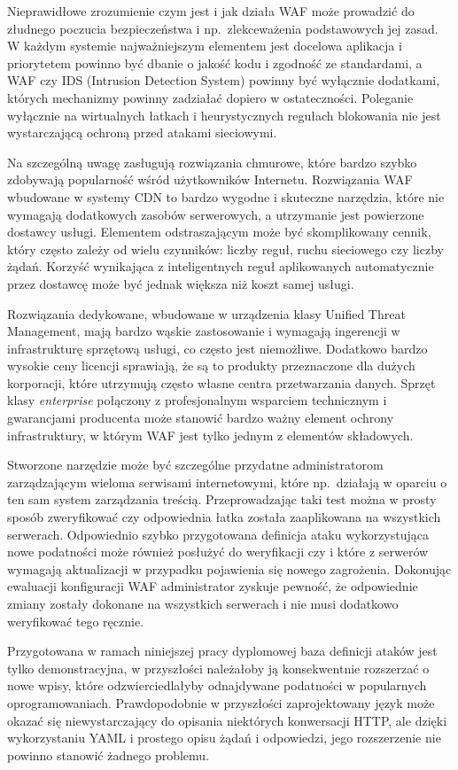 \documentclass[11pt,a4paper,polish,thesis,oneside]{dcsbook}
\begin{document}
Nieprawidłowe zrozumienie czym jest i jak działa WAF może prowadzić do złudnego poczucia bezpieczeństwa i np.~zlekceważenia podstawowych jej zasad. W każdym systemie najważniejszym elementem jest docelowa aplikacja i priorytetem powinno być dbanie o jakość kodu i zgodność ze standardami, a WAF czy IDS (Intrusion Detection System) powinny być wyłącznie dodatkami, których mechanizmy powinny zadziałać dopiero w ostateczności. Poleganie wyłącznie na wirtualnych łatkach i heurystycznych regułach blokowania nie jest wystarczającą ochroną przed atakami sieciowymi.

Na szczególną uwagę zasługują rozwiązania chmurowe, które bardzo szybko zdobywają popularność wśród użytkowników Internetu. Rozwiązania WAF wbudowane w systemy CDN to bardzo wygodne i skuteczne narzędzia, które nie wymagają dodatkowych zasobów serwerowych, a utrzymanie jest powierzone dostawcy usługi. Elementem odstraszającym może być skomplikowany cennik, który często zależy od wielu czynników: liczby reguł, ruchu sieciowego czy liczby żądań. Korzyść wynikająca z inteligentnych reguł aplikowanych automatycznie przez dostawcę może być jednak większa niż koszt samej usługi.

Rozwiązania dedykowane, wbudowane w urządzenia klasy Unified Threat Management, mają bardzo wąskie zastosowanie i wymagają ingerencji w infrastrukturę sprzętową usługi, co często jest niemożliwe. Dodatkowo bardzo wysokie ceny licencji sprawiają, że są to produkty przeznaczone dla dużych korporacji, które utrzymują często własne centra przetwarzania danych. Sprzęt klasy \textit{enterprise} połączony z profesjonalnym wsparciem technicznym i gwarancjami producenta może stanowić bardzo ważny element ochrony infrastruktury, w którym WAF jest tylko jednym z elementów składowych.

Stworzone narzędzie może być szczególne przydatne administratorom zarządzającym wieloma serwisami internetowymi, które np.~działają w oparciu o ten sam system zarządzania treścią. Przeprowadzając taki test można w prosty sposób zweryfikować czy odpowiednia łatka została zaaplikowana na wszystkich serwerach. Odpowiednio szybko przygotowana definicja ataku wykorzystująca nowe podatności może również posłużyć do weryfikacji czy i które z serwerów wymagają aktualizacji w przypadku pojawienia się nowego zagrożenia. Dokonując ewaluacji konfiguracji WAF administrator zyskuje pewność, że odpowiednie zmiany zostały dokonane na wszystkich serwerach i nie musi dodatkowo weryfikować tego ręcznie.
 
Przygotowana w ramach niniejszej pracy dyplomowej baza definicji ataków jest tylko demonstracyjna, w przyszłości należałoby ją konsekwentnie rozszerzać o nowe wpisy, które odzwierciedlałyby odnajdywane podatności w popularnych oprogramowaniach. Prawdopodobnie w przyszłości zaprojektowany język może okazać się niewystarczający do opisania niektórych konwersacji HTTP, ale dzięki wykorzystaniu YAML i prostego opisu żądań i odpowiedzi, jego rozszerzenie nie powinno stanowić żadnego problemu.
\end{document}
